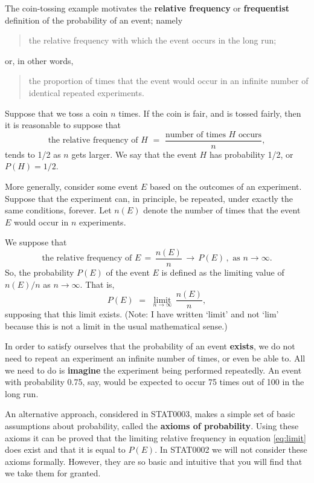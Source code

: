 \documentclass[
  11pt,
  british,
  openany, a4paper]{book}
\begin{document}
The coin-tossing example motivates the \textbf{relative frequency} or \textbf{frequentist} definition of the probability of an event; namely

\begin{quote}
the relative frequency with which the event occurs in the long run;
\end{quote}

or, in other words,

\begin{quote}
the proportion of times that the event would occur in an infinite number of identical repeated experiments.
\end{quote}

Suppose that we toss a coin \(n\) times. If the coin is fair, and is tossed fairly, then it is reasonable to suppose that
\[\mbox{the relative frequency of $H$} \,\,=\,\, 
\frac{\mbox{number of times $H$ occurs}}{n},\]
tends to 1/2 as \(n\) gets larger. We say that the event \(H\) has probability 1/2, or \(P(H)=1/2\).

More generally, consider some event \(E\) based on the outcomes of an experiment. Suppose that the experiment can, in principle, be repeated, under exactly the same conditions, forever. Let \(n(E)\) denote the number of times that the event \(E\) would occur in \(n\) experiments.

We suppose that
\[\mbox{the relative frequency of $E$} \,=\,
\frac{n(E)}{n} \,\longrightarrow\, P(E)\,, \,\, \mbox{as }n \longrightarrow \infty.\]
So, the probability \(P(E)\) of the event \(E\) is defined as the limiting value of \(n(E)/n\) as \(n \rightarrow \infty\). That is,
\begin{equation}
P(E) \,\,=\,\, \mathop {\mathrm{limit}}\limits_{n \rightarrow \infty}\,\frac{n(E)}{n},
\label{eq:limit}
\end{equation}
supposing that this limit exists. (Note: I have written `limit' and not `lim' because this is not a limit in the usual mathematical sense.)

In order to satisfy ourselves that the probability of an event \textbf{exists}, we do not need to repeat an experiment an infinite number of times, or even be able to. All we need to do is \textbf{imagine} the experiment being performed repeatedly. An event with probability 0.75, say, would be expected to occur 75 times out of 100 in the long run.

An alternative approach, considered in STAT0003, makes a simple set of basic assumptions about probability, called the \textbf{axioms of probability}. Using these axioms it can be proved that the limiting relative frequency in equation \eqref{eq:limit} does exist and that it is equal to \(P(E)\). In STAT0002 we will not consider these axioms formally. However, they are so basic and intuitive that you will find that we take them for granted.
\end{document}
